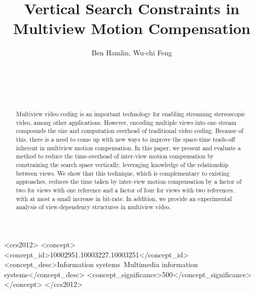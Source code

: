 \documentclass{sig-alternate-05-2015}
\begin{document}


\title{Vertical Search Constraints in Multiview Motion Compensation}
\author{
\alignauthor
Ben Hamlin, Wu-chi Feng\\
       \\
       \\
       \\
       \\
}

\maketitle

\begin{abstract}
Multiview video coding is an important technology for enabling streaming
stereoscopic video, among other applications. However, encoding multiple
views into one stream compounds the size and computation overhead of
traditional video coding. Because of this, there is a need to come up with new
ways to improve the space-time trade-off inherent in multiview motion
compensation. In this paper, we present and evaluate a method to reduce the
time-overhead of inter-view motion compensation by constraining the search space
vertically, leveraging knowledge of the relationship between views. We show that
this technique, which is complementary to existing approaches, reduces the time
taken by inter-view motion compensation by a factor of two for views with one
reference and a factor of four for views with two references, with at most a
small increase in bit-rate. In addition, we provide an experimental analysis of
view-dependency structures in multiview video.
\end{abstract}

\begin{CCSXML}
<ccs2012>
<concept>
<concept_id>10002951.10003227.10003251</concept_id>
<concept_desc>Information systems~Multimedia information systems</concept_desc>
<concept_significance>500</concept_significance>
</concept>
</ccs2012>
\end{CCSXML}
\printccsdesc
\end{document}
